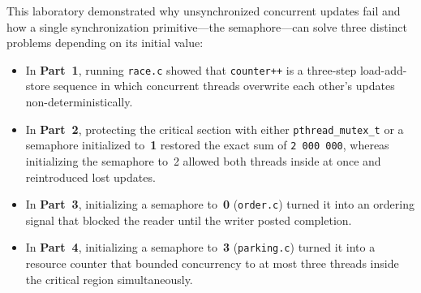 \documentclass{../latex/utmreport}
\providecommand{\tightlist}{\setlength{\itemsep}{0pt}\setlength{\parskip}{0pt}}
\begin{document}
This laboratory demonstrated why unsynchronized concurrent updates fail and how a single synchronization primitive—the semaphore—can solve three distinct problems depending on its initial value:
\begin{itemize}
\tightlist
\item In \textbf{Part~1}, running \texttt{race.c} showed that \texttt{counter++} is a three-step load-add-store sequence in which concurrent threads overwrite each other's updates non-deterministically.
\item In \textbf{Part~2}, protecting the critical section with either \texttt{pthread\_mutex\_t} or a semaphore initialized to~\textbf{1} restored the exact sum of \texttt{2\,000\,000}, whereas initializing the semaphore to~2 allowed both threads inside at once and reintroduced lost updates.
\item In \textbf{Part~3}, initializing a semaphore to~\textbf{0} (\texttt{order.c}) turned it into an ordering signal that blocked the reader until the writer posted completion.
\item In \textbf{Part~4}, initializing a semaphore to~\textbf{3} (\texttt{parking.c}) turned it into a resource counter that bounded concurrency to at most three threads inside the critical region simultaneously.
\end{itemize}
\end{document}
